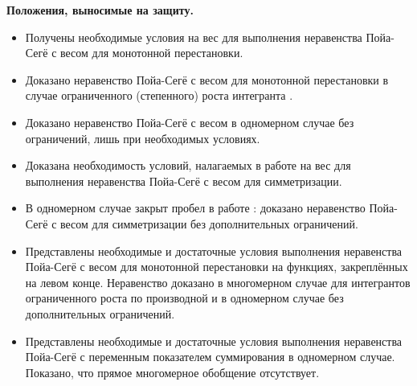 \textbf{Положения, выносимые на защиту.}
\begin{itemize}
    \item Получены необходимые условия на вес для выполнения неравенства Пойа-Сегё с весом для монотонной перестановки.
    \item Доказано неравенство Пойа-Сегё с весом для монотонной перестановки в случае ограниченного (степенного) роста интегранта .
    \item Доказано неравенство Пойа-Сегё с весом в одномерном случае без ограничений, лишь при необходимых условиях.
    \item Доказана необходимость условий, налагаемых в работе \cite{Brock} на вес для выполнения
        неравенства Пойа-Сегё с весом для симметризации.
    \item В одномерном случае закрыт пробел в работе \cite{Brock}: доказано неравенство Пойа-Сегё с весом для симметризации
        без дополнительных ограничений.
    \item Представлены необходимые и достаточные условия выполнения неравенства Пойа-Сегё с весом для монотонной перестановки
        на функциях, закреплённых на левом конце.
        Неравенство доказано в многомерном случае для интегрантов ограниченного роста по производной
        и в одномерном случае без дополнительных ограничений.
    \item Представлены необходимые и достаточные условия выполнения неравенства Пойа-Сегё с переменным показателем
        суммирования в одномерном случае.
        Показано, что прямое многомерное обобщение отсутствует.
\end{itemize}

